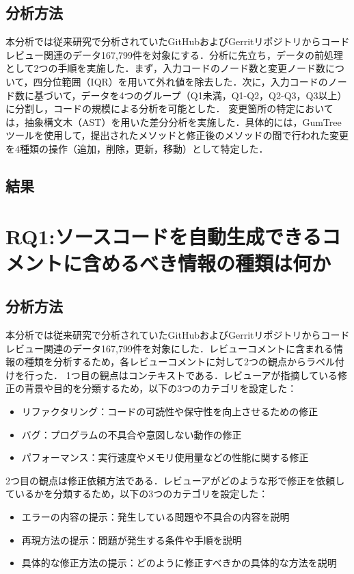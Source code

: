 \documentclass[twocolumn]{jarticle} %
\newcommand{\RQone}{ソースコードを自動生成できるコメントに含めるべき情報の種類は何か}
\begin{document}
\subsection{分析方法}

本分析では従来研究\cite{tufano2022using}で分析されていたGitHubおよびGerritリポジトリからコードレビュー関連のデータ167,799件を対象にする．分析に先立ち，データの前処理として2つの手順を実施した．まず，入力コードのノード数と変更ノード数について，四分位範囲（IQR）を用いて外れ値を除去した．次に，入力コードのノード数に基づいて，データを4つのグループ（Q1未満，Q1-Q2，Q2-Q3，Q3以上）に分割し，コードの規模による分析を可能とした．
変更箇所の特定においては，抽象構文木（AST）を用いた差分分析を実施した．具体的には，GumTreeツールを使用して，提出されたメソッドと修正後のメソッドの間で行われた変更を4種類の操作（追加，削除，更新，移動）として特定した．

\subsection{結果}

\fi

\section{RQ1:\RQone}

\subsection{分析方法}

本分析では従来研究\cite{tufano2022using}で分析されていたGitHubおよびGerritリポジトリからコードレビュー関連のデータ167,799件を対象にした．レビューコメントに含まれる情報の種類を分析するため，各レビューコメントに対して2つの観点からラベル付けを行った．
1つ目の観点はコンテキストである．レビューアが指摘している修正の背景や目的を分類するため，以下の3つのカテゴリを設定した：
\begin{itemize}
\item リファクタリング：コードの可読性や保守性を向上させるための修正
\item バグ：プログラムの不具合や意図しない動作の修正
\item パフォーマンス：実行速度やメモリ使用量などの性能に関する修正
\end{itemize}
2つ目の観点は修正依頼方法である．レビューアがどのような形で修正を依頼しているかを分類するため，以下の3つのカテゴリを設定した：
\begin{itemize}
\item エラーの内容の提示：発生している問題や不具合の内容を説明
\item 再現方法の提示：問題が発生する条件や手順を説明
\item 具体的な修正方法の提示：どのように修正すべきかの具体的な方法を説明
\end{itemize}
\end{document}
